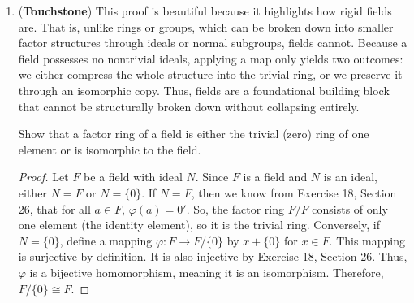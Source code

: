 \documentclass[12pt, oneside]{book}
\newcommand{\pf}[1]{
    \begin{customframedproof}[linecolor=horange!75]
        \begin{proof}
        #1
        \end{proof}
    \end{customframedproof}
}
\begin{document}
\begin{enumerate}[label=\textbf{\arabic*.}]
    Let \(R\) be a commutative ring and let \(a \in R\). Show that \(I_{a} = \{x \in R \mid ax = 0\}\) is an ideal of \(R\). 
    \pf{
        To prove that \(I_{a}\) is a subring of \(R\), we must show the following:
        \begin{enumerate}[label=(\arabic*)]
            \item \(0\in I_a\) because \(a\cdot 0=0\).
            \item If \(b,c\in I_a\) then \(a(b-c) = ab-ac = 0 - 0 = 0\) by the distributive laws of \(R\) and the definition of \(I_{a}\). Thus, \(b-c\in I_a\).
            \item If \(b,c\in I_a\) then \(a(bc) = (ab)c = 0 \cdot c = 0\) by the associativity from \(R\) and the definition of \(I_{a}\). Thus, \(bc\in I_a\).
        \end{enumerate}
        Therefore, \(I_a\) is a subring of \(R\). Thus, we need only show that \(xr \in I_a\) and \(rx \in I_a\) for \(x \in I_a\) and \(r \in R\). Thus, consider the following:
        \[
            a(xr) = (ax)r = 0 \cdot r = 0.
        \]
        So, \(xr \in I_{a}\). Now, since \(R\) is a commutative ring, we can rearrange \(a(rx)\):
        \[
            a(rx) = a(xr) = 0.
        \]
        So, \(rx \in I_{a}\). Therefore, we have shown that \(I_{a}\) is an ideal of \(R\).
    }

    \item (\textbf{Touchstone}) This proof is beautiful because it highlights how rigid fields are. That is, unlike rings or groups, which can be broken down into smaller factor structures through ideals or normal subgroups, fields cannot. Because a field possesses no nontrivial ideals, applying a map only yields two outcomes: we either compress the whole structure into the trivial ring, or we preserve it through an isomorphic copy. Thus, fields are a foundational building block that cannot be structurally broken down without collapsing entirely.

    Show that a factor ring of a field is either the trivial (zero) ring of one element or is isomorphic to the field. 
    \pf{
        Let \(F\) be a field with ideal \(N\). Since \(F\) is a field and \(N\) is an ideal, either \(N = F\) or \(N = \{0\}\). If \(N = F\), then we know from Exercise 18, Section 26, that for all \(a \in F\), \(\varphi(a) = 0'\). So, the factor ring \(F/F\) consists of only one element (the identity element), so it is the trivial ring. Conversely, if \(N = \{0\}\), define a mapping \(\varphi : F \to F/\{0\}\) by \(x + \{0\}\) for \(x \in F\). This mapping is surjective by definition. It is also injective by Exercise 18, Section 26. Thus, \(\varphi\) is a bijective homomorphism, meaning it is an isomorphism. Therefore, \(F/\{0\} \cong F\).
    }


\end{enumerate}
\end{document}
